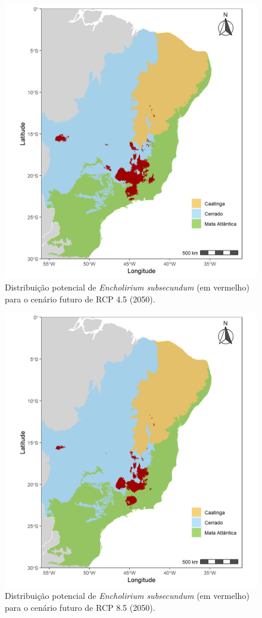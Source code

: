 \documentclass[
  11pt,
]{article}
\begin{document}
\begin{figure}
\centering
\includegraphics[width=1\textwidth,height=\textheight]{../Graficos/E_subsecundum_mapas_feitos/RCP45.jpeg}
\caption{Distribuição potencial de \emph{Encholirium subsecundum} (em
vermelho) para o cenário futuro de RCP 4.5 (2050).}
\end{figure}

\begin{figure}
\centering
\includegraphics[width=1\textwidth,height=\textheight]{../Graficos/E_subsecundum_mapas_feitos/RCP85.jpeg}
\caption{Distribuição potencial de \emph{Encholirium subsecundum} (em
vermelho) para o cenário futuro de RCP 8.5 (2050).}
\end{figure}
\end{document}
